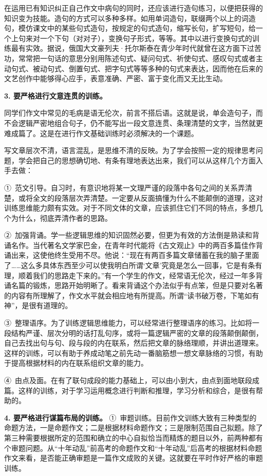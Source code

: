在运用已有知识纠正自己作文中病句的同时，还应该进行造句练习，以便把获得的知识变为技能。造句的方式可以多种多样。如用单词造句，联缀两个以上的词造句，模仿课文中的某些句式造句，按规定的句式造句，缩写长句，扩写短句，给一个上句来对一个下句（对对子），变换句子形式，等等。其中以进行变换句式的训练最有实效。据说，俄国大文豪列夫·托尔斯泰在青少年时代就曾在这方面下过苦功，常常把一句话的意思分别用陈述句式、疑问句式、祈使句式、感叹句式或者主动句式、被动句式、倒置句式、把字句式等等多种的句式来表达，因而他在后来的文艺创作中能够得心应手，表意准确、严密、富于变化而又无比生动。

\textbf{3. 要严格进行文意连贯的训练。}

同学们作文中常见的毛病是语无伦次，前言不搭后语。这就是说，单会造句子，而不会逻辑严密地组合句子，仍不能写出一段文意连贯、条理清楚的文字，当然就更难成篇了。这是在进行作文基础训练时必须解决的一个课题。

写文章层次不清，语言混乱，是思维不清的反映。为了学会按照一定的规律思考问题，学会把自己的思想确切地、有条有理地表达出来，我们可以从这样几个方面入手去做：

①\ 范文引导。自习时，有意识地将某一文理严谨的段落中各句之间的关系弄清楚，或将全文的段落层次弄清楚。一定要从反面搞懂为什么不能颠倒的道理，这对训练思维能力颇有实效。对于不同文体的文章，应该抓住它们不同的特点，多想几个为什么，彻底弄清作者的思路。

②\ 加强背诵。学一些逻辑思维的知识固然必要，但更为有效的方法倒是熟读和背诵名作。当代著名文学家巴金，在青年时代能将《古文观止》中的两百多篇佳作背诵出来，这使他终生受用不尽。他说：“现在有两百多篇文章储蓄在我的脑子里面了……这么多具体东西至少可以使我明白所谓‘文章’究竟是怎么一回事，它是有条有理，顺着我们的思路走下来的。”有一个学生的作文，经常语无伦次，经过一年多背诵名篇的锻炼，思路开始明晰了。看来背诵这个办法似乎有点笨，但是只要对名著的内容有所理解了，作文水平就会相应地有所提高。所谓“读书破万卷，下笔如有神”，是很有道理的。

③\ 整理语序。为了训练逻辑思维能力，可以经常进行整理语序的练习。比如将一段结构严谨、层次分明的话打乱句序，或将一篇逻辑严密的文章的段落颠倒颠倒，自己去找出句与句、段与段的内在联系，然后把文章的脉络理顺，并讲出道理来。这样的训练，可以有助于养成动笔之前先动一番脑筋想一想文章脉络的习惯，有助于提高根据材料的内在联系组织文章的能力。

④\ 由点及面。在有了联句成段的能力基础上，可以由小到大，由点到面地联段成篇。这样的训练，对于学习运用概念进行判断和推理，学习分析和综合，是很有帮助的。

\textbf{4. 要严格进行谋篇布局的训练。}
①\ 审题训练。目前作文训练大致有三种类型的命题方法，一是命题作文；二是根据材料命题作文；三是限制范围自己拟题。除了第三种需要根据所定的范围和确立的中心自拟恰当而精炼的题目以外，前两种都有个审题问题。从“十年动乱”前高考的命题作文和“十年动乱”后高考的根据材料命题作文来看，是否能正确审题是一篇作文成败的关键。这就要在平时作好严格的审题训练。

